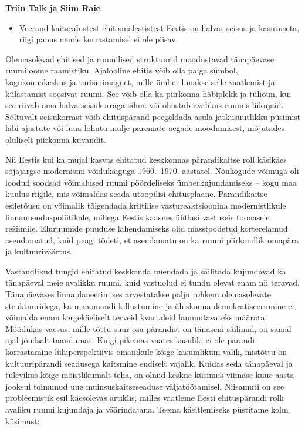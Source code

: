 \documentclass[estonian,]{article}
\providecommand{\tightlist}{%
  \setlength{\itemsep}{0pt}\setlength{\parskip}{0pt}}
\begin{document}
\begin{authors}
\textbf{Triin Talk ja Siim Raie}
\end{authors}

\begin{points}
\begin{itemize}
\tightlist
\item
  Veerand kaitsealustest ehitismälestistest Eestis on halvas seisus ja
  kasutuseta, riigi panus nende korrastamisel ei ole piisav.
\end{itemize}
\end{points}

Olemasolevad ehitised ja ruumilised struktuurid moodustavad tänapäevase ruumiloome raamistiku. Ajalooline ehitis võib olla paiga sümbol, kogukonnakeskus ja turismimagnet, mille ümber luuakse selle vaatlemist ja külastamist soosivat ruumi. See võib olla ka piirkonna häbiplekk ja tüliõun, kui see riivab oma halva seisukorraga silma või ohustab avalikus ruumis liikujaid. Sõltuvalt seisukorrast võib ehituspärand peegeldada asula jätkusuutlikku püsimist läbi ajastute või luua lohutu mulje paremate aegade möödumisest, mõjutades oluliselt piirkonna kuvandit.

Nii Eestis kui ka mujal kasvas ehitatud keskkonnas pärandikaitse roll käsikäes sõjajärgse modernismi võidukäiguga 1960.--1970. aastatel. Nõukogude võimuga oli loodud soodsad võimalused ruumi pöördeliseks ümberkujundamiseks -- kogu maa kuulus riigile, mis võimaldas seada utoopilisi ehitusplaane. Pärandikaitse esiletõusu on võimalik tõlgendada kriitilise vastureaktsioonina modernistlikule linnauuenduspoliitikale, millega Eestis kaasnes ühtlasi vastuseis toonasele režiimile. Eluruumide puuduse lahendamiseks olid masstoodetud korterelamud asendamatud, kuid peagi tõdeti, et asendamatu on ka ruumi piirkondlik omapära ja kultuuriväärtus.

Vastandlikud tungid ehitatud keskkonda uuendada ja säilitada kujundavad ka tänapäeval meie avalikku ruumi, kuid vastuolud ei tundu olevat enam nii teravad. Tänapäevases linnaplaneerimises arvestatakse palju rohkem olemasolevate struktuuridega, ka maaomandi killustumine ja ühiskonna demokratiseerumine ei võimalda enam kergekäeliselt terveid kvartaleid lammutavateks määrata. Mõõdukas vaesus, mille tõttu suur osa pärandist on tänaseni säilinud, on samal ajal jõudsalt taandumas. Kuigi pikemas vaates kasulik, ei ole pärandi korrastamine lühiperspektiivis omanikule kõige kasumlikum valik, mistõttu on kultuuripärandi seadusega kaitsmine endiselt vajalik. Kuidas seda tänapäeval ja tulevikus kõige mõistlikumalt teha, on olnud keskne küsimus viimase kuue aasta jooksul toimunud uue muinsuskaitseseaduse väljatöötamisel. Niisamuti on see probleemistik esil käesolevas artiklis, milles vaatleme Eesti ehituspärandi rolli avaliku ruumi kujundaja ja väärindajana. Teema käsitlemiseks püstitame kolm küsimust:
\end{document}
